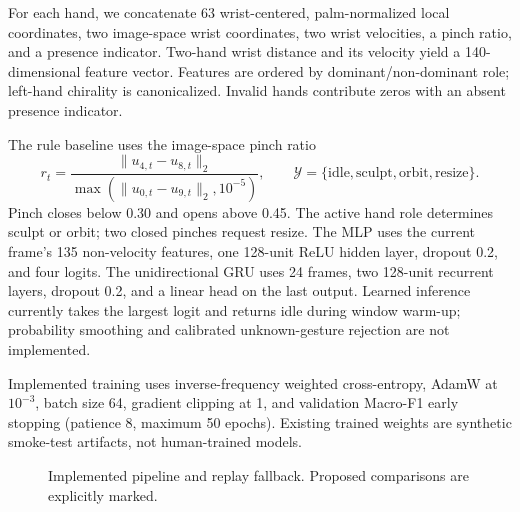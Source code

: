 \documentclass{article}
\begin{document}
For each hand, we concatenate 63 wrist-centered, palm-normalized local coordinates,
two image-space wrist coordinates, two wrist velocities, a pinch ratio, and a presence
indicator. Two-hand wrist distance and its velocity yield a 140-dimensional feature
vector. Features are ordered by dominant/non-dominant role; left-hand chirality is
canonicalized. Invalid hands contribute zeros with an absent presence indicator.

The rule baseline uses the image-space pinch ratio
\begin{equation}
 r_t=\frac{\|u_{4,t}-u_{8,t}\|_2}{\max(\|u_{0,t}-u_{9,t}\|_2,10^{-5})},
 \qquad \mathcal{Y}=\{\mathrm{idle},\mathrm{sculpt},\mathrm{orbit},\mathrm{resize}\}.
\end{equation}
Pinch closes below 0.30 and opens above 0.45. The active hand role determines sculpt
or orbit; two closed pinches request resize. The MLP uses the current frame's 135
non-velocity features, one 128-unit ReLU hidden layer, dropout 0.2, and four logits.
The unidirectional GRU uses 24 frames, two 128-unit recurrent layers, dropout 0.2,
and a linear head on the last output. Learned inference currently takes the largest
logit and returns idle during window warm-up; probability smoothing and calibrated
unknown-gesture rejection are not implemented.

Implemented training uses inverse-frequency weighted cross-entropy, AdamW at
$10^{-3}$, batch size 64, gradient clipping at 1, and validation Macro-F1 early
stopping (patience 8, maximum 50 epochs). Existing trained weights are synthetic
smoke-test artifacts, not human-trained models.

\begin{figure}[htbp]
\centering
{}
\caption{Implemented pipeline and replay fallback. Proposed comparisons are explicitly marked.}
\label{fig:pipeline}
\end{figure}
\end{document}
